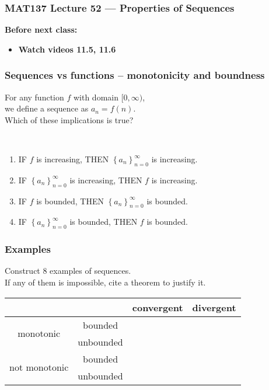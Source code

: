 \documentclass[14pt]{beamer}
\newcommand{\setsize}[1]{\fontsize{#1}{#1}\selectfont} %
\newcommand{\smallerfont}{\setsize{13}} %
\newcommand{\an}{\left\{ a_n \right\}_{n=0}^{\infty}}
\newcommand{\tasma}{\phantom{${\displaystyle \int_{\dfrac 11}^9}$ ???????? }}
\begin{document}
\begin{frame}
	\frametitle{MAT137 Lecture 52 --- Properties of Sequences}

	\vfill
	{\bf Before next class:}
		\begin{itemize} \normalsize
			\item {\bf Watch videos 11.5, 11.6}
		\end{itemize}
\end{frame}
	\begin{frame}[t]
		\frametitle{Sequences vs functions -- monotonicity and boundness}

		For any function $f$ with domain $[0, \infty)$, \\ we define a sequence as $a
		_{n} = f(n)$. \\ Which of these implications is true?

		\

		\begin{enumerate}
			\item IF $f$ is increasing, THEN ${\displaystyle \an}$ is increasing.
				\vfill

			\item IF ${\displaystyle \an}$ is increasing, THEN $f$ is increasing.
				\vfill

			\item IF $f$ is bounded, THEN ${\displaystyle \an}$ is bounded.
				\vfill

			\item IF ${\displaystyle \an}$ is bounded, THEN $f$ is bounded.
				\vfill
		\end{enumerate}
	\end{frame}
	\begin{frame}[t]
		\smallerfont
		\frametitle{Examples}

		Construct 8 examples of sequences. \\ If any of them is impossible, cite a
		theorem to justify it.

		\begin{center}
			\begin{tabular}{|c|c|c|c|}
				\hline
				                               &           & convergent & divergent \\
				\hline
				\multirow{2}{*}{monotonic}     & bounded   & \tasma     & \tasma    \\
				\cline{2-4}                    & unbounded & \tasma     & \tasma    \\
				\hline
				\multirow{2}{*}{not monotonic} & bounded   & \tasma     & \tasma    \\
				\cline{2-4}                    & unbounded & \tasma     & \tasma    \\
				\hline
			\end{tabular}
		\end{center}
	\end{frame}
\end{document}
